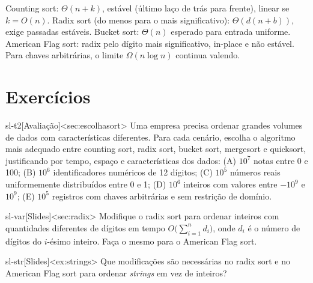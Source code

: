 \begin{chave}
Counting sort: $\Theta(n+k)$, estável (último laço de trás para frente), linear se $k=O(n)$. Radix sort (do menos para o mais significativo): $\Theta(d(n+b))$, exige passadas estáveis. Bucket sort: $\Theta(n)$ esperado para entrada uniforme. American Flag sort: radix pelo dígito mais significativo, in-place e não estável. Para chaves arbitrárias, o limite $\Omega(n\log n)$ continua valendo.
\end{chave}

\section{Exercícios}
\excurso
\begin{exercicio}{sl-t2}[Avaliação]<sec:escolhasort>
Uma empresa precisa ordenar grandes volumes de dados com características diferentes. Para cada cenário, escolha o algoritmo mais adequado entre counting sort, radix sort, bucket sort, mergesort e quicksort, justificando por tempo, espaço e características dos dados: (A) $10^7$ notas entre 0 e 100; (B) $10^6$ identificadores numéricos de 12 dígitos; (C) $10^5$ números reais uniformemente distribuídos entre 0 e 1; (D) $10^6$ inteiros com valores entre $-10^9$ e $10^9$; (E) $10^5$ registros com chaves arbitrárias e sem restrição de domínio.
\end{exercicio}
\begin{exercicio}{sl-var}[Slides]<sec:radix>
Modifique o radix sort para ordenar inteiros com quantidades diferentes de dígitos em tempo $O\big(\sum_{i=1}^nd_i\big)$, onde $d_i$ é o número de dígitos do $i$-ésimo inteiro. Faça o mesmo para o American Flag sort.
\end{exercicio}
\begin{exercicio}{sl-str}[Slides]<ex:strings>
Que modificações são necessárias no radix sort e no American Flag sort para ordenar \emph{strings} em vez de inteiros?
\end{exercicio}

